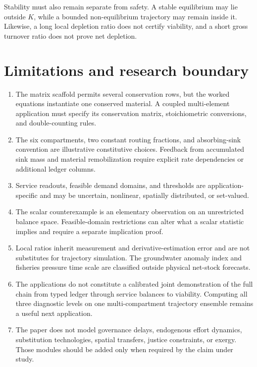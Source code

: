 \documentclass[11pt]{article}
\begin{document}
Stability must also remain separate from safety. A stable equilibrium may lie outside $K$, while a bounded non-equilibrium trajectory may remain inside it. Likewise, a long local depletion ratio does not certify viability, and a short gross turnover ratio does not prove net depletion.

\section{Limitations and research boundary}

\begin{enumerate}
    \item The matrix scaffold permits several conservation rows, but the worked equations instantiate one conserved material. A coupled multi-element application must specify its conservation matrix, stoichiometric conversions, and double-counting rules.
    \item The six compartments, two constant routing fractions, and absorbing-sink convention are illustrative constitutive choices. Feedback from accumulated sink mass and material remobilization require explicit rate dependencies or additional ledger columns.
    \item Service readouts, feasible demand domains, and thresholds are application-specific and may be uncertain, nonlinear, spatially distributed, or set-valued.
    \item The scalar counterexample is an elementary observation on an unrestricted balance space. Feasible-domain restrictions can alter what a scalar statistic implies and require a separate implication proof.
    \item Local ratios inherit measurement and derivative-estimation error and are not substitutes for trajectory simulation. The groundwater anomaly index and fisheries pressure time scale are classified outside physical net-stock forecasts.
    \item The applications do not constitute a calibrated joint demonstration of the full chain from typed ledger through service balances to viability. Computing all three diagnostic levels on one multi-compartment trajectory ensemble remains a useful next application.
    \item The paper does not model governance delays, endogenous effort dynamics, substitution technologies, spatial transfers, justice constraints, or exergy. Those modules should be added only when required by the claim under study.
\end{enumerate}
\end{document}
